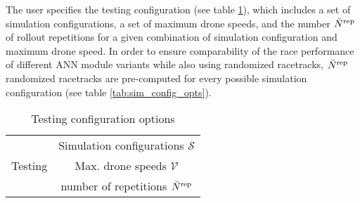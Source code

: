 The user specifies the testing configuration
(see table \ref{tab:test_config}),
which includes a set of simulation configurations,
a set of maximum drone speeds,
and the number $\num[\user]{\text{rep}}{}{}{}$ of rollout repetitions for a given
combination of simulation configuration and maximum drone speed.
In order to ensure comparability of the race performance
of different ANN module variants while also using randomized racetracks,
$\num[\user]{\text{rep}}{}{}{}$ randomized racetracks are pre-computed 
for every possible simulation configuration 
(see table \ref{tab:sim_config_opts}).
\begin{table}[h]
    \caption{Testing configuration options
    \label{tab:test_config}}
    \centering
    \begin{tabular}{|c|c|} 
        \hline
        \multirow{3}{*}{Testing}   
        &Simulation configurations $\mathcal{S}$
        \\\cline{2-2}
        &Max. drone speeds $\mathcal{V}$
        \\\cline{2-2}
        &number of repetitions $\num[\user]{\text{rep}}{}{}{}$
        \\\hline
    \end{tabular}
\end{table}

